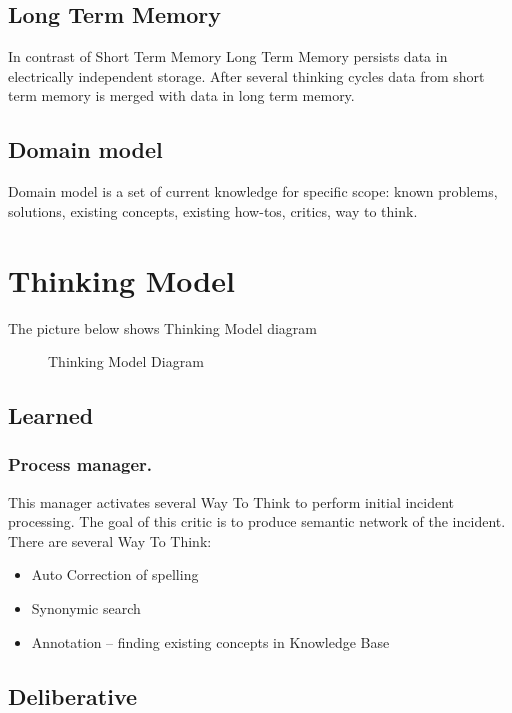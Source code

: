 \documentclass[runningheads,a4paper]{llncs}
\begin{document}
\subsection{Long Term Memory}
In contrast of Short Term Memory Long Term Memory persists data in electrically independent storage. After several thinking cycles data from short term memory is merged with data in long term memory.

\subsection{Domain model}
Domain model is a set of current knowledge for specific scope: known problems, solutions, existing concepts, existing how-tos, critics, way to think.\\

\section{Thinking Model}
The picture below shows Thinking Model diagram

\begin{figure}


\caption{Thinking Model Diagram}
\end{figure}

\subsection{Learned}

\subsubsection{Process manager.} This manager activates several Way To Think to perform initial incident processing. The goal of this critic is to produce semantic network of the incident. There are several Way To Think:
\begin{itemize}
 \item Auto Correction of spelling
 \item Synonymic search
 \item Annotation – finding existing concepts in Knowledge Base
\end{itemize}

\subsection{Deliberative}
\end{document}

